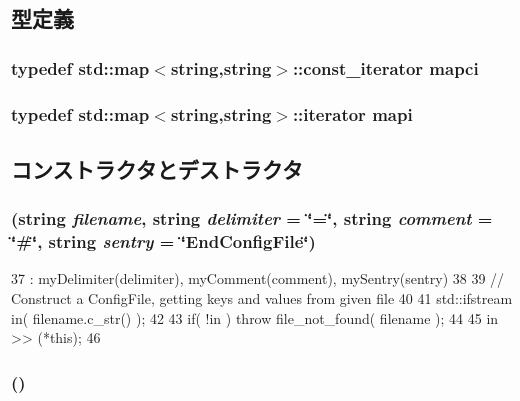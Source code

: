 \subsection{型定義}
\hypertarget{classConfigFile_a09401403dcfe6bf8cb142b5abe7d9b04}{
\subsubsection[{mapci}]{\setlength{\rightskip}{0pt plus 5cm}typedef std::map$<$string,string$>$::const\_\-iterator {\bf mapci}}}
\label{classConfigFile_a09401403dcfe6bf8cb142b5abe7d9b04}
\hypertarget{classConfigFile_a6eae9b2b09d40f1620dfaa1430405113}{
\subsubsection[{mapi}]{\setlength{\rightskip}{0pt plus 5cm}typedef std::map$<$string,string$>$::iterator {\bf mapi}}}
\label{classConfigFile_a6eae9b2b09d40f1620dfaa1430405113}


\subsection{コンストラクタとデストラクタ}
\hypertarget{classConfigFile_a161016a864f1f19d99b839dddf863c3f}{
\subsubsection[{ConfigFile}]{ (string {\em filename}, \/  string {\em delimiter} = {\ttfamily \char`\"{}=\char`\"{}}, \/  string {\em comment} = {\ttfamily \char`\"{}\#\char`\"{}}, \/  string {\em sentry} = {\ttfamily \char`\"{}EndConfigFile\char`\"{}})}}
\label{classConfigFile_a161016a864f1f19d99b839dddf863c3f}



\begin{DoxyCode}
37         : myDelimiter(delimiter), myComment(comment), mySentry(sentry)
38 {
39     // Construct a ConfigFile, getting keys and values from given file
40 
41     std::ifstream in( filename.c_str() );
42 
43     if( !in ) throw file_not_found( filename ); 
44 
45     in >> (*this);
46 }
\end{DoxyCode}
\hypertarget{classConfigFile_ad4ed3e0910ee375843bd52dea576f857}{
\subsubsection[{ConfigFile}]{ ()}}
\label{classConfigFile_ad4ed3e0910ee375843bd52dea576f857}



